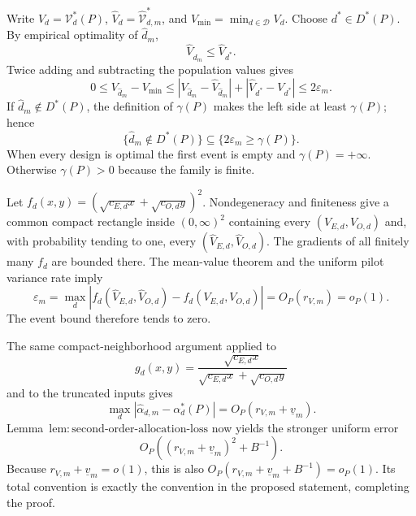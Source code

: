 Write \(V_d=\mathcal V_d^*(P)\), \(\widehat V_d=\widehat{\mathcal V}_{d,m}^*\), and \(V_{\min}=\min_{d\in\mathcal D}V_d\). Choose \(d^*\in D^*(P)\). By empirical optimality of \(\widehat d_m\),
\[
\widehat V_{\widehat d_m}\le\widehat V_{d^*}.
\]
Twice adding and subtracting the population values gives
\[
0\le V_{\widehat d_m}-V_{\min}
\le |V_{\widehat d_m}-\widehat V_{\widehat d_m}|
+|\widehat V_{d^*}-V_{d^*}|
\le2\varepsilon_m.
\]
If \(\widehat d_m\notin D^*(P)\), the definition of \(\gamma(P)\) makes the left side at least \(\gamma(P)\); hence
\[
\{\widehat d_m\notin D^*(P)\}
\subseteq\{2\varepsilon_m\ge\gamma(P)\}.
\]
When every design is optimal the first event is empty and \(\gamma(P)=+\infty\). Otherwise \(\gamma(P)>0\) because the family is finite.

Let \(f_d(x,y)=(\sqrt{c_{E,d}x}+\sqrt{c_{O,d}y})^2\). Nondegeneracy and finiteness give a common compact rectangle inside \((0,\infty)^2\) containing every \((V_{E,d},V_{O,d})\) and, with probability tending to one, every \((\widehat V_{E,d},\widehat V_{O,d})\). The gradients of all finitely many \(f_d\) are bounded there. The mean-value theorem and the uniform pilot variance rate imply
\[
\varepsilon_m
=\max_d|f_d(\widehat V_{E,d},\widehat V_{O,d})
-f_d(V_{E,d},V_{O,d})|
=O_P(r_{V,m})=o_P(1).
\]
The event bound therefore tends to zero.

The same compact-neighborhood argument applied to
\[
g_d(x,y)=\frac{\sqrt{c_{E,d}x}}
{\sqrt{c_{E,d}x}+\sqrt{c_{O,d}y}}
\]
and to the truncated inputs gives
\[
\max_d|\widehat\alpha_{d,m}-\alpha_d^*(P)|
=O_P(r_{V,m}+\underline v_m).
\]
Lemma~\(\mathrm{lem{:}second\text{-}order\text{-}allocation\text{-}loss}\) now yields the stronger uniform error
\[
O_P\!\left((r_{V,m}+\underline v_m)^2+B^{-1}\right).
\]
Because \(r_{V,m}+\underline v_m=o(1)\), this is also
\(O_P(r_{V,m}+\underline v_m+B^{-1})=o_P(1)\). Its total convention is exactly the convention in the proposed statement, completing the proof.